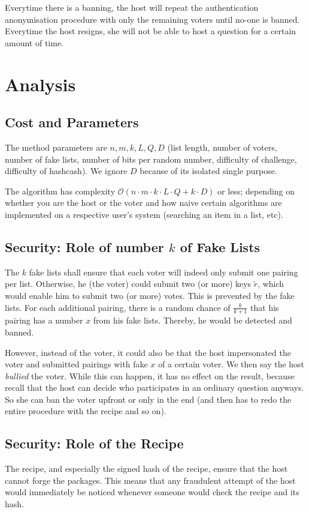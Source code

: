 \documentclass{article}
\newcommand{\cO}{\mathcal{O}\xspace}
\theoremstyle{definition}
\begin{document}
	Everytime there is a banning, the host will repeat the authentication anonymisation procedure with only the remaining voters until no-one is banned. Everytime the host resigns, she will not be able to host a question for a certain amount of time.
	
	\section{Analysis}
	
	\subsection{Cost and Parameters}
	The method parameters are $n,m,k,L,Q,D$ (list length, number of voters, number of fake lists, number of bits per random number, difficulty of challenge, difficulty of hashcash). We ignore $D$ because of its isolated single purpose.
	
	The algorithm has complexity $\cO(n \cdot m \cdot k \cdot L \cdot Q+k \cdot D)$ or less; depending on whether you are the host or the voter and how naive certain algorithms are implemented on a respective user's system (searching an item in a list, etc).
	
	
	\subsection{Security: Role of number $k$ of Fake Lists}
	The $k$ fake lists shall ensure that each voter will indeed only submit one pairing per list. Otherwise, he (the voter) could submit two (or more) keys $\tilde{r}$, which would enable him to submit two (or more) votes. This is prevented by the fake lists. For each additional pairing, there is a random chance of $\frac{k}{k+1}$ that his pairing has a number $x$ from his fake lists. Thereby, he would be detected and banned.
	
	However, instead of the voter, it could also be that the host impersonated the voter and submitted pairings with fake $x$ of a certain voter. We then say the host \emph{bullied} the voter. While this can happen, it has no effect on the result, because recall that the host can decide who participates in an ordinary question anyways. So she can ban the voter upfront or only in the end (and then has to redo the entire procedure with the recipe and so on).
	
	\subsection{Security: Role of the Recipe}
	The recipe, and especially the signed hash of the recipe, ensure that the host cannot forge the packages. This means that any fraudulent attempt of the host would immediately be noticed whenever someone would check the recipe and its hash.
	
\end{document}
